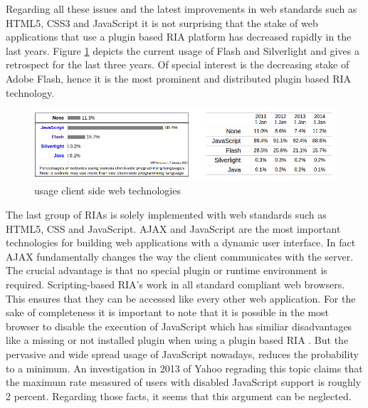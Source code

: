 Regarding all these issues and the latest improvements in web standards such as HTML5, CSS3 and JavaScript it is not surprising that the stake of web applications that use a plugin based RIA platform has decreased rapidly in the last years.
Figure \ref{fig:flash_usage} depicts the current usage of Flash and Silverlight and gives a retrospect for the last three years.
Of special interest is the decreasing stake of Adobe Flash, hence it is the most prominent and distributed plugin based RIA technology.

\begin{figure}
	\centering \includegraphics[width=1.0\textwidth]{./img/web-dev/flash_usage.png}
	\caption{usage client side web technologies \autocite[]{ria_flash-usage}}
	\label{fig:flash_usage}
\end{figure}

The last group of RIAs is solely implemented with web standards such as HTML5, CSS and JavaScript.
AJAX and JavaScript are the most important technologies for building web applications with a dynamic user interface. In fact AJAX fundamentally changes the way the client communicates with the server.
The crucial advantage is that no special plugin or runtime environment is required. 
Scripting-based RIA's work in all standard compliant web browsers.
This ensures that they can be accessed like every other web application. 
For the sake of completeness it is important to note that it is possible in the most browser to disable the execution of JavaScript which has similiar disadvantages like a missing or not installed plugin when using a plugin based RIA .
But the pervasive and wide spread usage of JavaScript nowadays, reduces the probability to a minimum. An investigation in 2013 of Yahoo regrading this topic \autocite{web-dev:js-disabled} claims that the maximum rate measured of users with disabled JavaScript support is roughly 2 percent. Regarding those facts, it seems that this argument can be neglected.

